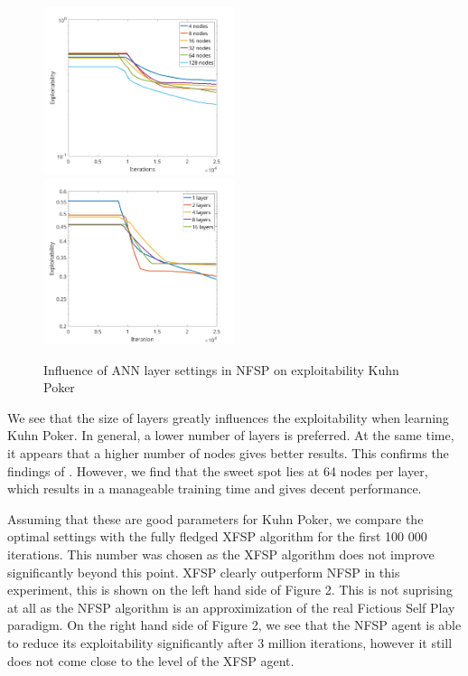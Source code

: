 \documentclass[10pt,a4paper]{article}
\begin{document}
\begin{center}
\begin{figure}[h]
\label{fig:layers_kuhn}
\includegraphics[width=0.5\textwidth]{Figures/kuhn_nodes.png}
\includegraphics[width=0.5\textwidth]{Figures/kuhn_layers.png}
\caption{Influence of ANN layer settings in NFSP on exploitability Kuhn Poker}
\end{figure}
\end{center}

We see that the size of layers greatly influences the exploitability when learning Kuhn Poker. In general, a lower number of layers is preferred. At the same time, it appears that a higher number of nodes gives better results. This confirms the findings of \citeauthor{heinrichphd} \cite{heinrichphd}. However, we find that the sweet spot lies at 64 nodes per layer, which results in a manageable training time and gives decent performance.


Assuming that these are good parameters for Kuhn Poker, we compare the optimal settings with the fully fledged XFSP algorithm for the first 100 000 iterations. This number was chosen as the XFSP algorithm does not improve significantly beyond this point. XFSP clearly outperform NFSP in this experiment, this is shown on the left hand side of Figure 2. This is not suprising at all as the NFSP algorithm is an approximization of the real Fictious Self Play paradigm.
On the right hand side of Figure 2, we see that the NFSP agent is able to reduce its exploitability significantly after 3 million iterations, however it still does not come close to the level of the XFSP agent.
\end{document}
